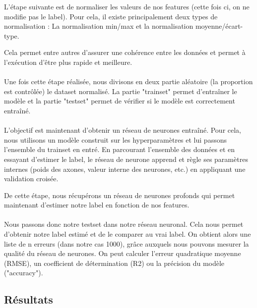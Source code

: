 L'étape suivante est de normaliser les valeurs de nos features (cette fois ci, on ne modifie pas le label). Pour cela, il existe principalement deux types de normalisation : La normalisation min/max et la normalisation moyenne/écart-type.

Cela permet entre autres d'assurer une cohérence entre les données et permet à l'exécution d'être plus rapide et meilleure.


\paragraph{}

Une fois cette étape réalisée, nous divisons en deux partie aléatoire (la proportion est contrôlée) le dataset normalisé. La partie "trainset" permet d'entraîner le modèle et la partie "testset" permet de vérifier si le modèle est correctement entraîné.

\paragraph{}

L'objectif est maintenant d'obtenir un réseau de neurones entraîné. Pour cela, nous utilisons un modèle construit sur les hyperparamètres et lui passons l'ensemble du trainset en entré. En parcourant l'ensemble des données et en essayant d'estimer le label, le réseau de neurone apprend et règle ses paramètres internes (poids des axones, valeur interne des neurones, etc.) en appliquant une validation croisée.

De cette étape, nous récupérons un réseau de neurones profonds qui permet maintenant d'estimer notre label en fonction de nos features.


\paragraph{}

Nous passons donc notre testset dans notre réseau neuronal. Cela nous permet d'obtenir notre label estimé et de le comparer au vrai label. On obtient alors une liste de n erreurs (dans notre cas 1000), grâce auxquels nous pouvons mesurer la qualité du réseau de neurones. On peut calculer l'erreur quadratique moyenne (RMSE), un coefficient de détermination (R2) ou la précision du modèle ("accuracy").

\subsection{Résultats}


